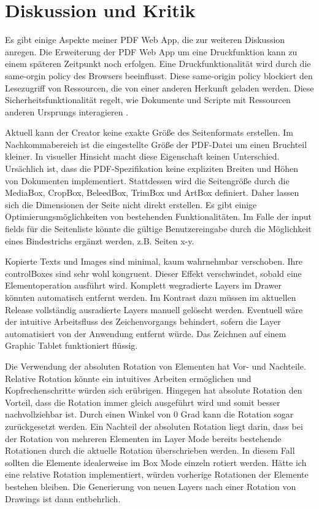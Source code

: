 \chapter{Diskussion und Kritik}
Es gibt einige Aspekte meiner PDF Web App, die zur weiteren Diskussion anregen. Die Erweiterung der PDF Web App um eine Druckfunktion kann zu einem späteren Zeitpunkt noch erfolgen. Eine Druckfunktionalität wird durch die same-orgin policy des Browsers beeinflusst. Diese same-origin policy blockiert den Lesezugriff von Ressourcen, die von einer anderen Herkunft geladen werden. Diese Sicherheitsfunktionalität regelt, wie Dokumente und Scripte mit Ressourcen anderen Ursprungs interagieren \cite{same-origin}. 
\par
Aktuell kann der Creator keine exakte Größe des Seitenformats erstellen. Im Nachkommabereich ist die eingestellte Größe der PDF-Datei um einen Bruchteil kleiner. In visueller Hinsicht macht diese Eigenschaft keinen Unterschied. Ursächlich ist, dass die PDF-Spezifikation keine expliziten Breiten und Höhen von Dokumenten implementiert. Stattdessen wird die Seitengröße durch die MediaBox, CropBox, BeleedBox, TrimBox und ArtBox definiert. Daher lassen sich die Dimensionen der Seite nicht direkt erstellen. Es gibt einige Optimierungsmöglichkeiten von bestehenden Funktionalitäten. Im Falle der input fields für die Seitenliste könnte die gültige Benutzereingabe durch die Möglichkeit eines Bindestrichs ergänzt werden, z.B. Seiten x-y. 
\par
Kopierte Texts und Images sind minimal, kaum wahrnehmbar verschoben. Ihre controlBoxes sind sehr wohl kongruent. Dieser Effekt verschwindet, sobald eine Elementoperation ausführt wird. Komplett wegradierte Layers im Drawer könnten automatisch entfernt werden. Im Kontrast dazu müssen im aktuellen Release vollständig ausradierte Layers manuell gelöscht werden. Eventuell wäre der intuitive Arbeitsfluss des Zeichenvorgangs behindert, sofern die Layer automatisiert von der Anwendung entfernt würde. Das Zeichnen auf einem Graphic Tablet funktioniert flüssig. 
\par
Die Verwendung der absoluten Rotation von Elementen hat Vor- und Nachteile. Relative Rotation könnte ein intuitives Arbeiten ermöglichen und Kopfrechenschritte würden sich erübrigen. Hingegen hat absolute Rotation den Vorteil, dass die Rotation immer gleich ausgeführt wird und somit besser nachvollziehbar ist. Durch einen Winkel von 0 Grad kann die Rotation sogar zurückgesetzt werden. Ein Nachteil der absoluten Rotation liegt darin, dass bei der Rotation von mehreren Elementen im Layer Mode bereits bestehende Rotationen durch die aktuelle Rotation überschrieben werden. In diesem Fall sollten die Elemente idealerweise im Box Mode einzeln rotiert werden. Hätte ich eine relative Rotation implementiert, würden vorherige Rotationen der Elemente bestehen bleiben. Die Generierung von neuen Layers nach einer Rotation von Drawings ist dann entbehrlich. 

